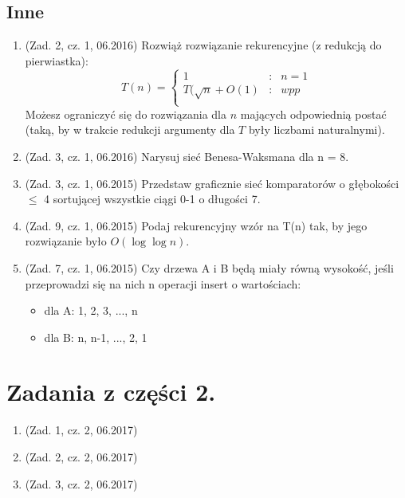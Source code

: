 \documentclass[10pt]{article}%
\begin{document}
\subsection*{Inne}

\begin{enumerate}

\item (Zad. 2, cz. 1, 06.2016) Rozwiąż rozwiązanie rekurencyjne (z redukcją do pierwiastka):
$$T(n) = \left\{\begin{array}{rcl}
1&:&n=1\\
T(\sqrt{n}+O(1)&:&wpp\\
\end{array} \right.$$
Możesz ograniczyć się do rozwiązania dla $n$ mających odpowiednią postać (taką, by w trakcie redukcji argumenty dla $T$ były liczbami naturalnymi).

\item (Zad. 3, cz. 1, 06.2016) Narysuj sieć Benesa-Waksmana dla n = 8.

\item (Zad. 3, cz. 1, 06.2015) Przedstaw graficznie sieć komparatorów o głębokości $\leq$ 4 sortującej wszystkie ciągi 0-1 o długości 7.

\item (Zad. 9, cz. 1, 06.2015) Podaj rekurencyjny wzór na T(n) tak, by jego rozwiązanie było $O(\log \log n)$.

\item (Zad. 7, cz. 1, 06.2015) Czy drzewa A i B będą miały równą wysokość, jeśli przeprowadzi się na nich n operacji insert o wartościach:
\begin{itemize}
	\item dla A: 1, 2, 3, ..., n 
	\item dla B: n, n-1, ..., 2, 1 
\end{itemize}

\end{enumerate}




\section*{Zadania z części 2.}
\begin{enumerate}

\item (Zad. 1, cz. 2, 06.2017)

\item (Zad. 2, cz. 2, 06.2017)

\item (Zad. 3, cz. 2, 06.2017)


\end{enumerate}
\end{document}
